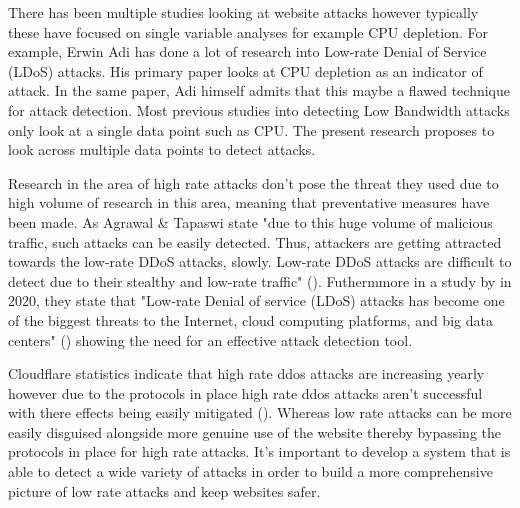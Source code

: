 
There has been multiple studies looking at website attacks however typically these have focused on single variable analyses for example CPU depletion. For example, Erwin Adi has done a lot of research into Low-rate Denial of Service (LDoS) attacks. His primary paper looks at CPU depletion as an indicator of attack. In the same paper, Adi himself admits that this maybe a flawed technique for attack detection. \cite{Adi2016} Most previous studies into detecting Low Bandwidth attacks only look at a single data point such as CPU. The present research proposes to look across multiple data points to detect attacks. 

Research in the area of high rate attacks don't pose the threat they used due to high volume of research in this area, meaning that preventative measures have been made. As Agrawal \& Tapaswi state "due to this huge volume of malicious traffic, such attacks can be easily detected. Thus, attackers are getting attracted towards the low-rate DDoS attacks, slowly. Low-rate DDoS attacks are difficult to detect due to their stealthy and low-rate traffic" (\cite{8794618}). Futhermmore in a study by \citeauthor{9016229} in 2020, they state that "Low-rate Denial of service (LDoS) attacks has become one of the biggest threats to the Internet, cloud computing platforms, and big data centers" (\cite{9016229}) showing the need for an effective attack detection tool.

Cloudflare statistics indicate that high rate ddos attacks are increasing yearly however due to the protocols in place high rate ddos attacks aren't successful with there effects being easily mitigated (\cite{Q3attacks}). Whereas low rate attacks can be more easily disguised alongside more genuine use of the website thereby bypassing the protocols in place for high rate attacks. It's important to develop a system that is able to detect a wide variety of attacks in order to build a more comprehensive picture of low rate attacks and keep websites safer.

